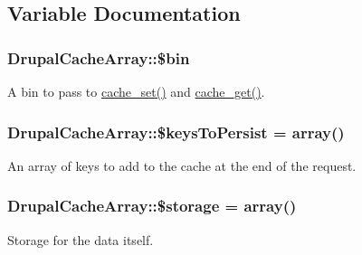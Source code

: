 \subsection{Variable Documentation}
\hypertarget{group__schemaapi_ga29eeef3160c70f129c447e796e330cdb}{
\subsubsection[{\$bin}]{\setlength{\rightskip}{0pt plus 5cm}DrupalCacheArray::\$bin}}
\label{group__schemaapi_ga29eeef3160c70f129c447e796e330cdb}
A bin to pass to \hyperlink{includes_2cache_8inc_a48081f36334909f561ef4f538fa640d2}{cache\_\-set()} and \hyperlink{includes_2cache_8inc_a9d873815c28909b61c3a6188b383f8a3}{cache\_\-get()}. \hypertarget{group__schemaapi_ga0ba2e712f18ec2c8ee8bf97d115c85d1}{
\subsubsection[{\$keysToPersist}]{\setlength{\rightskip}{0pt plus 5cm}DrupalCacheArray::\$keysToPersist = array()}}
\label{group__schemaapi_ga0ba2e712f18ec2c8ee8bf97d115c85d1}
An array of keys to add to the cache at the end of the request. \hypertarget{group__schemaapi_ga696fd96aa3639a9d7d968961db9d5819}{
\subsubsection[{\$storage}]{\setlength{\rightskip}{0pt plus 5cm}DrupalCacheArray::\$storage = array()}}
\label{group__schemaapi_ga696fd96aa3639a9d7d968961db9d5819}
Storage for the data itself. 